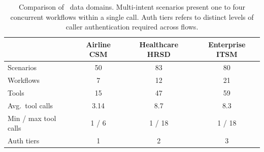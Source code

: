 
\begin{table}[h]
\centering
\small
\captionsetup{font=small}
\caption{Comparison of \framework~data domains. 
Multi-intent scenarios present one to four concurrent workflows within 
a single call. Auth tiers refers to distinct levels of caller 
authentication required across flows.}
\begin{tabular}{lccc}
\toprule
& \textbf{Airline CSM} & \textbf{Healthcare HRSD} 
& \textbf{Enterprise ITSM} \\
\midrule
Scenarios              & 50    & 83    & 80    \\
Workflows              & 7     & 12    & 21   \\
Tools                  & 15    & 47    & 59   \\
Avg.\ tool calls       & 3.14  & 8.7   & 8.3  \\
Min / max tool calls   & 1 / 6 & 1 / 18 & 1 / 18 \\
Auth tiers             & 1     & 2     & 3    \\
\bottomrule
\end{tabular}
\label{tab:datasets}
\end{table}